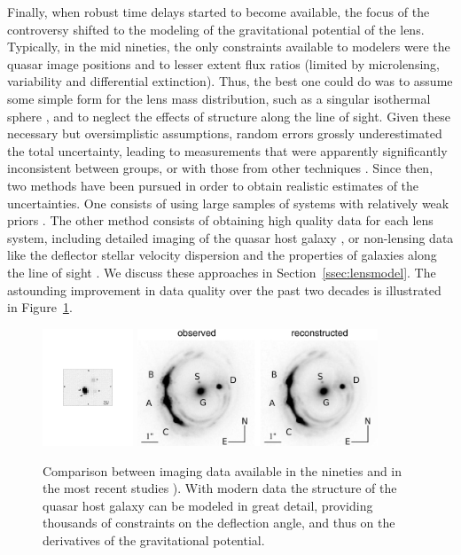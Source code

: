 Finally, when robust time delays started to become available, the
focus of the controversy shifted to the modeling of the gravitational
potential of the lens. Typically, in the mid nineties, the only
constraints available to modelers were the quasar image positions and
to lesser extent flux ratios (limited by microlensing, variability and
differential extinction). Thus, the best one could do was to assume
some simple form for the lens mass distribution, such as a singular isothermal
sphere \citep{K+F99},
and to neglect the
effects of structure along the line of sight. Given these necessary
but oversimplistic assumptions, random errors grossly underestimated
the total uncertainty, leading to measurements that were apparently
significantly inconsistent
between groups, or with those from other techniques
\citep{K+S04}. Since then, two methods have been pursued in order to
obtain realistic estimates of the uncertainties. One consists of using
large samples of systems with relatively weak priors
\citep{Ogu07b}. The other method consists of obtaining high quality data for
each lens system, including detailed imaging of the quasar host galaxy
\citep{Keeton:2000p241,KKM01,Koo++03,WBB04,Suy++06}, or non-lensing data like the deflector
stellar velocity dispersion \citep{T+K02b} and the properties of
galaxies along the line of sight \citep{K+Z04,Suy++10}. We discuss
these approaches in Section~\ref{ssec:lensmodel}. The astounding
improvement in data quality over the past two decades is illustrated
in Figure~\ref{fig:oldvsmodernimage}.

\begin{figure}
\includegraphics[height=3.5cm]{figures/Schechter97_fg1.pdf}
\includegraphics[height=3.5cm]{figures/Suyu14_fig1.jpg}
\caption{Comparison between imaging data available in the nineties
\citep[eft panel, from][]{Sch++97} and in the most recent studies
\citep[middle and right panels, from][]{Suy++14}). With modern data the
structure of the quasar host galaxy can be modeled in great detail,
providing thousands of constraints on the deflection angle, and thus on
the derivatives of the gravitational potential.}
\label{fig:oldvsmodernimage}
\end{figure}

